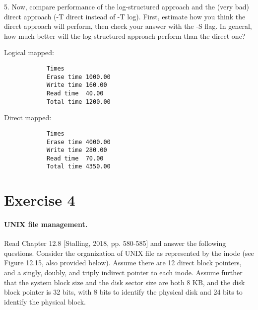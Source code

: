 \documentclass{article}
\newcommand{\exercise}[1]{
    \section*{Exercise #1}
    \markboth{Exercise #1}{}
}
\begin{document}
    5. Now, compare performance of the log-structured approach and the
    (very bad) direct approach (-T direct instead of -T log). First,
    estimate how you think the direct approach will perform, then check
    your answer with the -S flag. In general, how much better will the
    log-structured approach perform than the direct one?\newline

    Logical mapped:
    \scriptsize {
        \begin{verbatim}
            Times
            Erase time 1000.00
            Write time 160.00
            Read time  40.00
            Total time 1200.00
        \end{verbatim}
    }
    Direct mapped:
    \scriptsize {
        \begin{verbatim}
            Times
            Erase time 4000.00
            Write time 280.00
            Read time  70.00
            Total time 4350.00
        \end{verbatim}
    }




\newpage
\exercise{4}
\paragraph{UNIX file management.} Read Chapter 12.8 [Stalling, 2018, pp. 580-585] and
answer the following questions. Consider the organization of UNIX file as represented
by the inode (see Figure 12.15, also provided below). Assume there are 12 direct block
pointers, and a singly, doubly, and triply indirect pointer to each inode. Assume further
that the system block size and the disk sector size are both 8 KB, and the disk block
pointer is 32 bits, with 8 bits to identify the physical disk and 24 bits to identify
the physical block.
\end{document}
